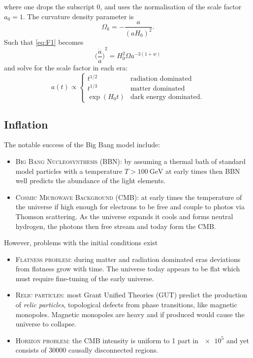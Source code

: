 %
where one drops the subscript \(0\), and uses the normalisation of the scale factor \(a_{0}=1\).
The curvature density parameter is
%
\begin{equation}
	\Omega_{k}
	= -\frac{a}{{(aH_{0})}^{2}}.
\end{equation}
%
Such that \cref{eq:F1} becomes
%
\begin{equation}
	{\bigg(\frac{\dot{a}}{a}\bigg)}^{2}
	= H_{0}^{2} \Omega a^{-3(1+w)}
\end{equation}
%
and solve for the scale factor in each era:
%
\begin{equation}
	a(t) \propto
	\begin{cases}
		t^{1/2}      & \text{radiation dominated}    \\
		t^{1/3}      & \text{matter dominated}       \\
		\exp(H_{0}t) & \text{dark energy dominated}.
	\end{cases}
\end{equation}

\subsection{Inflation}

The notable success of the Big Bang model include:
%
\begin{itemize}
	\item \textsc{Big Bang Nucleosynthesis (BBN)}:
	      by assuming a thermal bath of standard model particles with a temperature \(T > \SI{100}{\giga\eV}\) at early times then BBN well predicts the abundance of the light elements.

	\item \textsc{Cosmic Microwave Background (CMB)}:
	      at early times the temperature of the universe if high enough for electrons to be free and couple to photos via Thomson scattering. As the universe expands it cools and forms neutral hydrogen, the photons then free stream and today form the CMB\@.
\end{itemize}
%
However, problems with the initial conditions exist
%
\begin{itemize}
	\item \textsc{Flatness problem}:
	      during matter and radiation dominated eras deviations from flatness grow with time.
	      The universe today appears to be flat which must require fine-tuning of the early universe.

	\item \textsc{Relic particles}:
	      most Grant Unified Theories (GUT) predict the production of \emph{relic particles}, topological defects from phase transitions, like magnetic monopoles.
	      Magnetic monopoles are heavy and if produced would cause the universe to collapse.

	\item \textsc{Horizon problem}:
	      the CMB intensity is uniform to 1 part in \(\num{e5}\) and yet consists of \(\num{30000}\) causally disconnected regions.
\end{itemize}

